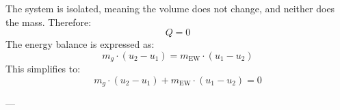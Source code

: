 The system is isolated, meaning the volume does not change, and neither does the mass. Therefore:  
\[
Q = 0
\]  
The energy balance is expressed as:  
\[
m_g \cdot (u_2 - u_1) = m_{\text{EW}} \cdot (u_1 - u_2)
\]  
This simplifies to:  
\[
m_g \cdot (u_2 - u_1) + m_{\text{EW}} \cdot (u_1 - u_2) = 0
\]  

---